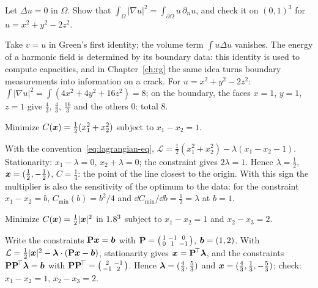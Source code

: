 \label{exo:dirichlet-energy}
Let $\Delta u=0$ in $\Omega$. Show that
$\displaystyle \int_\Omega|\nabla u|^2=\int_{\partial\Omega}u\,\partial_nu$, and check it on
$(0,1)^3$ for $u=x^2+y^2-2z^2$.
\begin{solution}
Take $v=u$ in Green's first identity; the volume term $\displaystyle \int u\Delta u$
vanishes. The energy of a harmonic field is determined by its boundary data:
this identity is used to compute capacities, and in Chapter~\ref{ch:rg} the
same idea turns boundary measurements into information on a crack. For
$u=x^2+y^2-2z^2$: $\displaystyle \int|\nabla u|^2=\int(4x^2+4y^2+16z^2)=8$; on the boundary, the faces
$x=1$, $y=1$, $z=1$ give $\tfrac43$, $\tfrac43$, $\tfrac{16}3$ and the others $0$: total $8$.
\end{solution}


\label{exo:kkt1}
Minimize $C(\bm{x})=\tfrac12(x_1^2+x_2^2)$ subject to $x_1-x_2=1$.
\begin{solution}
With the convention~\eqref{eq:lagrangian-eq},
$\mathcal L=\tfrac12(x_1^2+x_2^2)-\lambda(x_1-x_2-1)$. Stationarity:
$x_1-\lambda=0$, $x_2+\lambda=0$; the constraint gives $2\lambda=1$. Hence
$\lambda=\tfrac12$, $\bm{x}=(\tfrac12,-\tfrac12)$, $C=\tfrac14$: the point of the
line closest to the origin. With this sign the multiplier is also the
sensitivity of the optimum to the data: for the constraint $x_1-x_2=b$,
$C_{\min}(b)=b^2/4$ and $\dd C_{\min}/\dd b=\tfrac12=\lambda$ at $b=1$.
\end{solution}

\label{exo:kkt2}
Minimize $C(\bm{x})=\tfrac12|\bm{x}|^2$ in $1.8^3$ subject to $x_1-x_2=1$ and
$x_2-x_3=2$.
\begin{solution}
Write the constraints $\mathbf{P}\bm{x}=\bm{b}$ with
$\mathbf{P}=\begin{psmallmatrix}1&-1&0\\0&1&-1\end{psmallmatrix}$, $\bm{b}=(1,2)$.
With $\mathcal L=\tfrac12|\bm{x}|^2-\bm{\lambda}\cdot(\mathbf{P}\bm{x}-\bm{b})$, stationarity
gives $\bm{x}=\mathbf{P}^{\!\top}\bm{\lambda}$, and the constraints
$\mathbf{P}\mathbf{P}^{\!\top}\bm{\lambda}=\bm{b}$ with
$\mathbf{P}\mathbf{P}^{\!\top}=\begin{psmallmatrix}2&-1\\-1&2\end{psmallmatrix}$. Hence
$\bm{\lambda}=(\tfrac43,\tfrac53)$ and $\bm{x}=(\tfrac43,\tfrac13,-\tfrac53)$;
check: $x_1-x_2=1$, $x_2-x_3=2$.
\end{solution}

